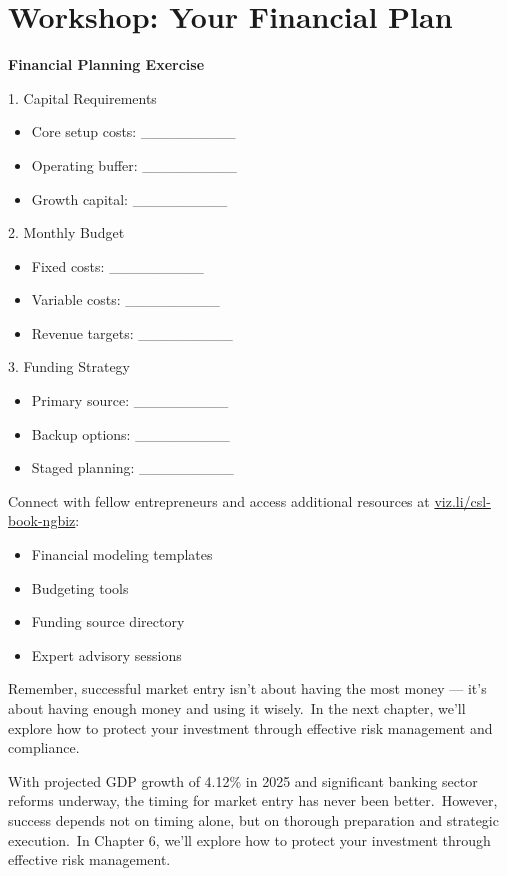 \section{Workshop: Your Financial Plan}\label{sec:workshop}

\begin{workshopbox}
\textbf{Financial Planning Exercise}

1. Capital Requirements
\begin{itemize}
    \item Core setup costs: \_\_\_\_\_\_\_\_\_
    \item Operating buffer: \_\_\_\_\_\_\_\_\_
    \item Growth capital: \_\_\_\_\_\_\_\_\_
\end{itemize}

2. Monthly Budget
\begin{itemize}
    \item Fixed costs: \_\_\_\_\_\_\_\_\_
    \item Variable costs: \_\_\_\_\_\_\_\_\_
    \item Revenue targets: \_\_\_\_\_\_\_\_\_
\end{itemize}

3. Funding Strategy
\begin{itemize}
    \item Primary source: \_\_\_\_\_\_\_\_\_
    \item Backup options: \_\_\_\_\_\_\_\_\_
    \item Staged planning: \_\_\_\_\_\_\_\_\_
\end{itemize}
\end{workshopbox}

\begin{communitybox}
Connect with fellow entrepreneurs and access additional resources at \href{https://viz.li/csl-book-ngbiz}{viz.li/csl-book-ngbiz}:
\begin{itemize}
    \item Financial modeling templates
    \item Budgeting tools
    \item Funding source directory
    \item Expert advisory sessions
\end{itemize}
\end{communitybox}

\begin{importantbox}
Remember, successful market entry isn't about having the most money --- it's about having enough money and using it wisely.\ In the next chapter, we'll explore how to protect your investment through effective risk management and compliance.

With projected GDP growth of 4.12\% in 2025 and significant banking sector reforms underway, the timing for market entry has never been better.\ However, success depends not on timing alone, but on thorough preparation and strategic execution.\ In Chapter 6, we'll explore how to protect your investment through effective risk management.
\end{importantbox}